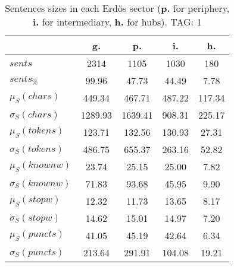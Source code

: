 \begin{table}[h!]
\begin{center}
\begin{tabular}{| l || c | c | c | c |}\hline
 & {\bf g.} & {\bf p.} & {\bf i.} & {\bf h.} \\\hline\hline
$sents$ & 2314  & 1105  & 1030  & 180 \\
$sents_{\%}$ & 99.96  & 47.73  & 44.49  & 7.78 \\\hline
$\mu_S(chars)$ & 449.34  & 467.71  & 487.22  & 117.34 \\
$\sigma_S(chars)$ & 1289.93  & 1639.41  & 908.31  & 225.17 \\\hline
$\mu_S(tokens)$ & 123.71  & 132.56  & 130.93  & 27.31 \\
$\sigma_S(tokens)$ & 486.75  & 655.37  & 263.16  & 52.82 \\\hline
$\mu_S(knownw)$ & 23.74  & 25.15  & 25.00  & 7.82 \\
$\sigma_S(knownw)$ & 71.83  & 93.68  & 45.95  & 9.90 \\\hline
$\mu_S(stopw)$ & 12.32  & 11.73  & 13.65  & 8.17 \\
$\sigma_S(stopw)$ & 14.62  & 15.01  & 14.97  & 7.20 \\\hline
$\mu_S(puncts)$ & 41.05  & 45.19  & 42.64  & 6.34 \\
$\sigma_S(puncts)$ & 213.64  & 291.91  & 104.08  & 19.21 \\\hline
\end{tabular}
\caption{Sentences sizes in each Erd\"os sector ({{\bf p.}} for periphery, {{\bf i.}} for intermediary, {{\bf h.}} for hubs). TAG: 1}
\end{center}
\end{table}